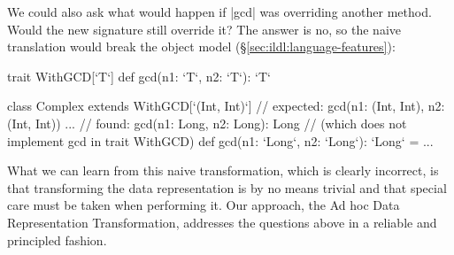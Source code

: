 We could also ask what would happen if |gcd| was overriding another method. Would the new signature still override it? The answer is no, so the naive translation would break the object model (\S\ref{sec:ildl:language-features}):

\begin{lstlisting-nobreak}
trait WithGCD[`T`] {
  def gcd(n1: `T`, n2: `T`): `T`
}

class Complex extends WithGCD[`(Int, Int)`] {
  // expected: gcd(n1: (Int, Int), n2: (Int, Int)) ...
  // found:    gcd(n1: Long, n2: Long): Long
  // (which does not implement gcd in trait WithGCD)
  def gcd(n1: `Long`, n2: `Long`): `Long` = ...
}
\end{lstlisting-nobreak}

What we can learn from this naive transformation, which is clearly incorrect, is that transforming the data representation is by no means trivial and that special care must be taken when performing it. Our approach, the Ad hoc Data Representation Transformation, addresses the questions above in a reliable and principled fashion.

